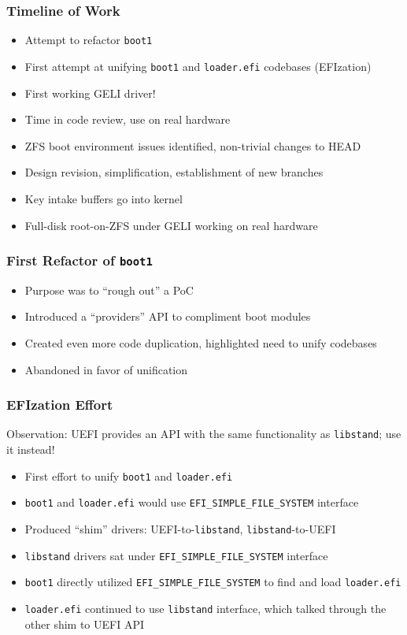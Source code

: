 \documentclass{beamer}
\begin{document}
\begin{frame}
  \frametitle{Timeline of Work}
  \begin{itemize}
  \item Attempt to refactor \texttt{boot1}
  \item First attempt at unifying \texttt{boot1} and
    \texttt{loader.efi} codebases (EFIzation)
  \item First working GELI driver!
  \item Time in code review, use on real hardware
  \item ZFS boot environment issues identified, non-trivial changes to HEAD
  \item Design revision, simplification, establishment of new branches
  \item Key intake buffers go into kernel
  \item Full-disk root-on-ZFS under GELI working on real hardware
  \end{itemize}
\end{frame}

\begin{frame}
  \frametitle{First Refactor of \texttt{boot1}}
  \begin{itemize}
  \item Purpose was to ``rough out'' a PoC
  \item Introduced a ``providers'' API to compliment boot modules
  \item Created even more code duplication, highlighted need to unify codebases
  \item Abandoned in favor of unification
  \end{itemize}
\end{frame}

\begin{frame}
  \frametitle{EFIzation Effort}
  Observation: UEFI provides an API with the same functionality as
  \texttt{libstand}; use it instead!
  \begin{itemize}
  \item First effort to unify \texttt{boot1} and \texttt{loader.efi}
  \item \texttt{boot1} and \texttt{loader.efi} would use
    \texttt{EFI\_SIMPLE\_FILE\_SYSTEM} interface
  \item Produced ``shim'' drivers: UEFI-to-\texttt{libstand},
    \texttt{libstand}-to-UEFI
  \item \texttt{libstand} drivers sat under
    \texttt{EFI\_SIMPLE\_FILE\_SYSTEM} interface
  \item \texttt{boot1} directly utilized
    \texttt{EFI\_SIMPLE\_FILE\_SYSTEM} to find and load \texttt{loader.efi}
  \item \texttt{loader.efi} continued to use \texttt{libstand}
    interface, which talked through the other shim to UEFI API
  \end{itemize}
\end{frame}
\end{document}
